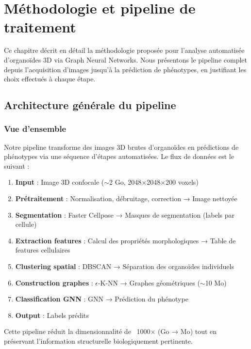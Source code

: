 
\chapter{Méthodologie et pipeline de traitement}

Ce chapitre décrit en détail la méthodologie proposée pour l'analyse automatisée d'organoïdes 3D via Graph Neural Networks. Nous présentons le pipeline complet depuis l'acquisition d'images jusqu'à la prédiction de phénotypes, en justifiant les choix effectués à chaque étape.

\section{Architecture générale du pipeline}

\subsection{Vue d'ensemble}

Notre pipeline transforme des images 3D brutes d'organoïdes en prédictions de phénotypes via une séquence d'étapes automatisées. Le flux de données est le suivant :

\begin{enumerate}
    \item \textbf{Input} : Image 3D confocale ($\sim$2 Go, 2048×2048×200 voxels)
    \item \textbf{Prétraitement} : Normalisation, débruitage, correction → Image nettoyée
    \item \textbf{Segmentation} : Faster Cellpose → Masques de segmentation (labels par cellule)
    \item \textbf{Extraction features} : Calcul des propriétés morphologiques → Table de features cellulaires
    \item \textbf{Clustering spatial} : DBSCAN → Séparation des organoïdes individuels
    \item \textbf{Construction graphes} : $\epsilon$-K-NN → Graphes géométriques ($\sim$10 Mo)
    \item \textbf{Classification GNN} : GNN → Prédiction du phénotype
    \item \textbf{Output} : Labels prédits
\end{enumerate}

Cette pipeline réduit la dimensionnalité de ~1000× (Go → Mo) tout en préservant l'information structurelle biologiquement pertinente.

